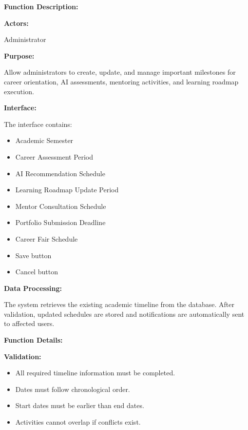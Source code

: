 \textbf{Function Description:}

\textbf{Actors:}

Administrator

\vspace{0.2cm}

\textbf{Purpose:}

Allow administrators to create, update, and manage important milestones for career orientation, AI assessments, mentoring activities, and learning roadmap execution.

\vspace{0.2cm}

\textbf{Interface:}

The interface contains:

\begin{itemize}
    \item Academic Semester
    \item Career Assessment Period
    \item AI Recommendation Schedule
    \item Learning Roadmap Update Period
    \item Mentor Consultation Schedule
    \item Portfolio Submission Deadline
    \item Career Fair Schedule
    \item Save button
    \item Cancel button
\end{itemize}

\vspace{0.2cm}

\textbf{Data Processing:}

The system retrieves the existing academic timeline from the database. After validation, updated schedules are stored and notifications are automatically sent to affected users.

\vspace{0.3cm}

\textbf{Function Details:}

\textbf{Validation:}

\begin{itemize}
    \item All required timeline information must be completed.
    \item Dates must follow chronological order.
    \item Start dates must be earlier than end dates.
    \item Activities cannot overlap if conflicts exist.
\end{itemize}

